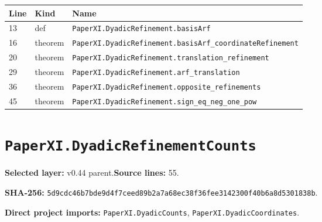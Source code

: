 \documentclass[10pt,oneside]{book}
\begin{document}
\begin{longtable}{@{}p{}p{}p{}@{}}\toprule Line&Kind&Name\\\midrule\endhead

13&def&\nolinkurl{PaperXI.DyadicRefinement.basisArf}\\

16&theorem&\nolinkurl{PaperXI.DyadicRefinement.basisArf_coordinateRefinement}\\

20&theorem&\nolinkurl{PaperXI.DyadicRefinement.translation_refinement}\\

29&theorem&\nolinkurl{PaperXI.DyadicRefinement.arf_translation}\\

36&theorem&\nolinkurl{PaperXI.DyadicRefinement.opposite_refinements}\\

45&theorem&\nolinkurl{PaperXI.DyadicRefinement.sign_eq_neg_one_pow}\\

\bottomrule\end{longtable}

\section{\texorpdfstring{\nolinkurl{PaperXI.DyadicRefinementCounts}}{PaperXI.DyadicRefinementCounts}}\label{module:PaperXI.DyadicRefinementCounts}

\textbf{Selected layer:} v0.44 parent.\quad\textbf{Source lines:} 55.\par\textbf{SHA-256:} {\scriptsize\nolinkurl{5d9cdc46b7bde9d4f7ceed89b2a7a68ec38f36fee3142300f40b6a8d5301838b}}.


\textbf{Direct project imports:} \nolinkurl{PaperXI.DyadicCounts}, \nolinkurl{PaperXI.DyadicCoordinates}.
\end{document}
